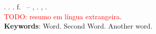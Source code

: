 
\begin{resumo}[ABSTRACT]
\begin{SingleSpacing}

\imprimirautorcitacao. \imprimirtitleabstract. \imprimirdata. \pageref {LastPage} f. \imprimirprojeto\ – \imprimirprograma, \imprimirinstituicao. \imprimirlocal, \imprimirdata.\\

\textcolor{red}{TODO: resumo em língua extrangeira}.\\

\textbf{Keywords}: Word. Second Word. Another word.

\end{SingleSpacing}
\end{resumo}

